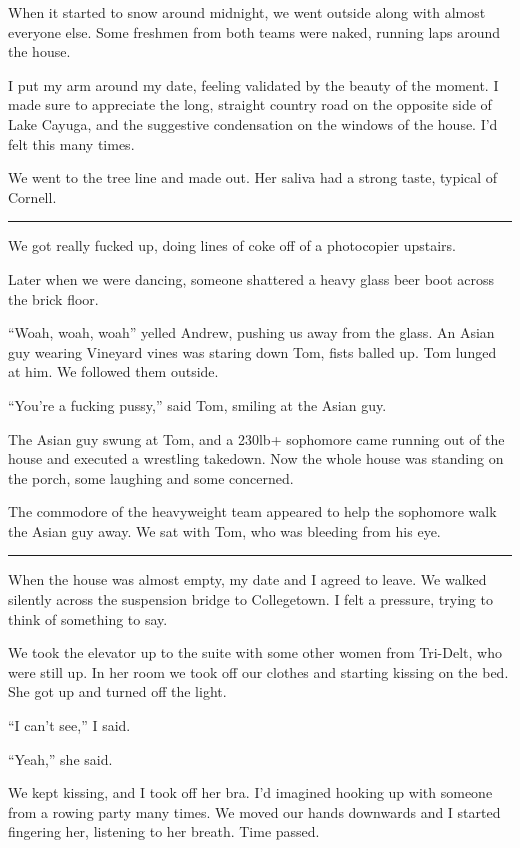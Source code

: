 When it started to snow around midnight, we went outside along with almost
everyone else.  Some freshmen from both teams were naked, running laps around
the house.

I put my arm around my date, feeling validated by the beauty of the moment.   I
made sure to appreciate the long, straight country road on the opposite side of
Lake Cayuga, and the suggestive condensation on the windows of the house.  I'd
felt this many times. 

We went to the tree line and made out.  Her saliva had a strong taste, typical
of Cornell.

\plainfancybreak{12pt}{2}{* * *}

We got really fucked up, doing lines of coke off of a photocopier upstairs.

Later when we were dancing, someone shattered a heavy glass beer boot across
the brick floor.  

``Woah, woah, woah'' yelled Andrew, pushing us away from the glass.  An Asian
guy wearing Vineyard vines was staring down Tom, fists balled up.  Tom lunged at
him.  We followed them outside.

``You're a fucking pussy,'' said Tom, smiling at the Asian guy.

The Asian guy swung at Tom, and a 230lb+ sophomore came running out of the house
and executed a wrestling takedown.  Now the whole house was standing on the
porch, some laughing and some concerned.

The commodore of the heavyweight team appeared to help the sophomore walk the
Asian guy away.  We sat with Tom, who was bleeding from his eye.

\plainfancybreak{12pt}{2}{* * *}

When the house was almost empty, my date and I agreed to leave.  We walked
silently across the suspension bridge to Collegetown.  I felt a pressure, trying
to think of something to say.

We took the elevator up to the suite with some other women from Tri-Delt, who
were still up.  In her room we took off our clothes and starting kissing on the
bed.  She got up and turned off the light.

``I can't see,'' I said.  

``Yeah,'' she said.

We kept kissing, and I took off her bra.  I'd imagined hooking up with someone
from a rowing party many times.  We moved our hands downwards and I started
fingering her, listening to her breath.  Time passed.

